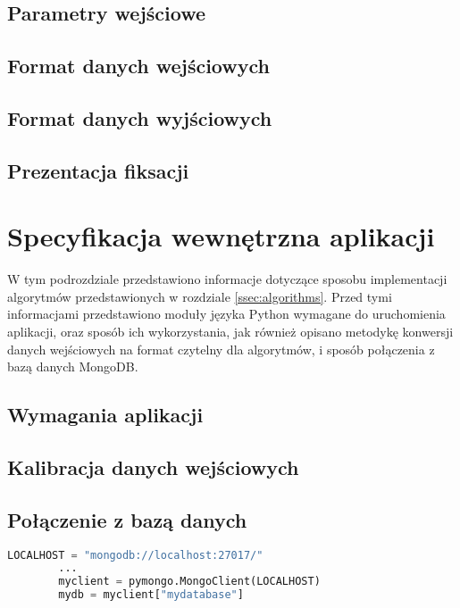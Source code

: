 \subsection{Parametry wejściowe}
\blindtext
\subsection{Format danych wejściowych}
\blindtext
\subsection{Format danych wyjściowych}
\blindtext
\subsection{Prezentacja fiksacji}
\blindtext
\section{Specyfikacja wewnętrzna aplikacji}
\label{sec:internal}
W tym podrozdziale przedstawiono informacje dotyczące sposobu implementacji algorytmów przedstawionych w rozdziale \ref{ssec:algorithms}. Przed tymi informacjami przedstawiono moduły języka Python wymagane do uruchomienia aplikacji, oraz sposób ich wykorzystania, jak również opisano metodykę konwersji danych wejściowych na format czytelny dla algorytmów, i sposób połączenia z bazą danych MongoDB.
\subsection{Wymagania aplikacji}
\label{ssec:apprequirements}
\blindtext
\subsection{Kalibracja danych wejściowych}
\label{ssec:calibration}
\blindtext
\subsection{Połączenie z bazą danych}
\label{ssec:connectionDB}
\begin{lstlisting}[language=Python, caption=Połączenie z bazą danych, label={lst:connectDB}]
        LOCALHOST = "mongodb://localhost:27017/"
        ...
        myclient = pymongo.MongoClient(LOCALHOST)
        mydb = myclient["mydatabase"]
\end{lstlisting}

